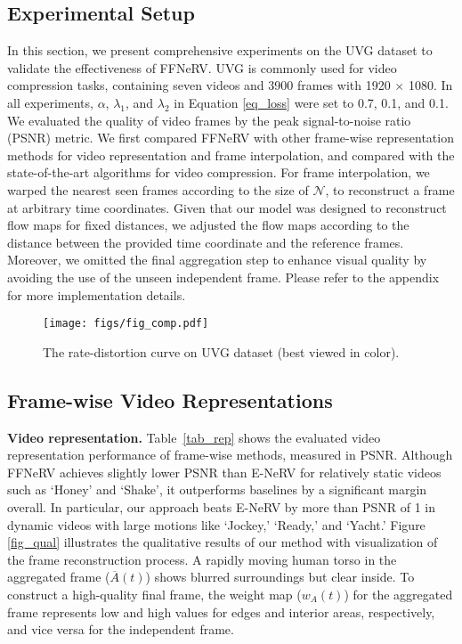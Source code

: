 \documentclass[sigconf]{acmart}
\begin{document}
\subsection{Experimental Setup}
In this section, we present comprehensive experiments on the UVG dataset \cite{uvg} to validate the effectiveness of FFNeRV.
UVG is commonly used for video compression tasks, containing seven videos and 3900 frames with 1920 × 1080.
In all experiments, $\alpha$, $\lambda_1$, and $\lambda_2$ in Equation \ref{eq_loss} were set to 0.7, 0.1, and 0.1.
We evaluated the quality of video frames by the peak signal-to-noise ratio (PSNR) metric.
We first compared FFNeRV with other frame-wise representation methods for video representation and frame interpolation, and compared with the state-of-the-art algorithms for video compression.
For frame interpolation, we warped the nearest seen frames according to the size of $\mathcal{N}$, to reconstruct a frame at arbitrary time coordinates. 
Given that our model was designed to reconstruct flow maps for fixed distances, we adjusted the flow maps according to the distance between the provided time coordinate and the reference frames. Moreover, we omitted the final aggregation step to enhance visual quality by avoiding the use of the unseen independent frame.
Please refer to the appendix for more implementation details.





\begin{figure}[t]
\begin{center}
\texttt{[image: figs/fig\_comp.pdf]}
\end{center}
   \caption{The rate-distortion curve on UVG dataset (best viewed in color).}
\label{fig_comp}
\end{figure}

\subsection{Frame-wise Video Representations}


\noindent\textbf{Video representation.} 
Table~\ref{tab_rep} shows the evaluated video representation performance of frame-wise methods, measured in PSNR.
Although FFNeRV achieves slightly lower PSNR than E-NeRV for relatively static videos such as `Honey' and `Shake', it outperforms baselines by a significant margin overall.
In particular, our approach beats E-NeRV by more than PSNR of 1 in dynamic videos with large motions like `Jockey,' `Ready,' and `Yacht.'
Figure \ref{fig_qual} illustrates the qualitative results of our method with visualization of the frame reconstruction process.
A rapidly moving human torso in the aggregated frame ($\overline{A}(t)$) shows blurred surroundings but clear inside.
To construct a high-quality final frame, the weight map ($w_A(t)$) for the aggregated frame represents low and high values for edges and interior areas, respectively, and vice versa for the independent frame.
\end{document}
